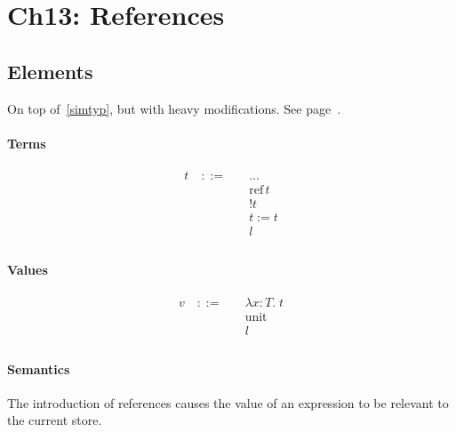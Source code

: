\documentclass{article}
\newcommand{\lamt}[3]{\lambda #1: #2 .\;#3}
\newcommand{\mref}{\mathrm{ref}\, }
\newcommand{\munit}{\text{unit}}
\begin{document}
\section{Ch13: References}
\subsection{Elements}
  On top of~\ref{simtyp}, but with heavy modifications. See page~\pageref{simtyp}.

\paragraph{Terms}
  \begin{align*}
    t \quad ::= \quad & \ldots \tag{var, abs, app, unit}\\
      & \mref t \tag{reference allocation} \\
      & !t \tag{dereference} \\
      & t := t \tag{assignment} \\
      & l \tag{store location}\\
  \end{align*}

\paragraph{Values}
  \begin{align*}
    v \quad ::= \quad & \lamt{x}{T}{t} \tag{abstraction} \\
      & \munit \tag{unit} \\
      & l \tag{store location}\\
  \end{align*}

\paragraph{Semantics}
  The introduction of references causes the value of an expression to be relevant to the current store.
\end{document}
